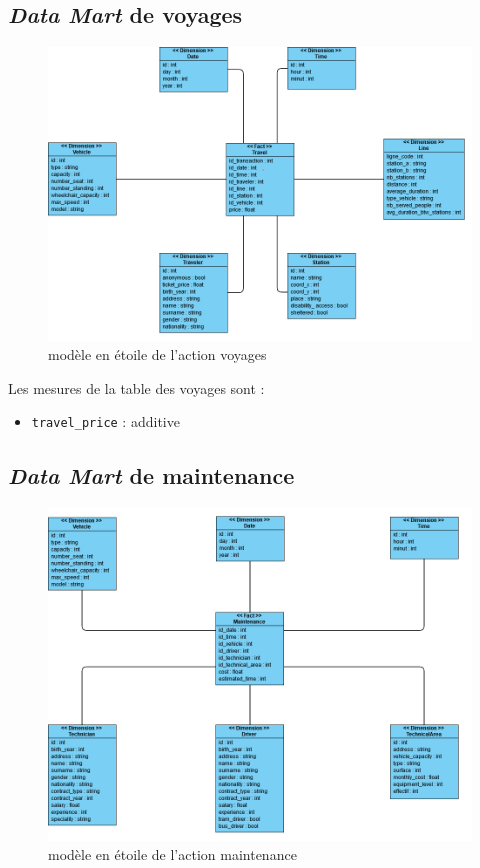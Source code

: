 \documentclass[a4paper,12pt]{report}
\begin{document}
\subsection*{\textit{Data Mart} de \og voyages \fg}
\label{subsec:data_mart_voyages}
\begin{figure}[!ht]
  \centering
  \includegraphics[scale=0.65]{images/voyages_datamart.png}
  \caption{modèle en étoile de l'action \og voyages \fg}
\end{figure}

Les mesures de la table des voyages sont :
\begin{itemize}
  \item \texttt{travel\_price} : additive
\end{itemize}

\newpage

\subsection*{\textit{Data Mart} de \og maintenance \fg}
\label{subsec:data_mart_maintenance}
\begin{figure}[!ht]
  \centering
  \includegraphics[scale=0.65]{images/maintenance_datamart.png}
  \caption{modèle en étoile de l'action \og maintenance \fg}
\end{figure}
\end{document}
